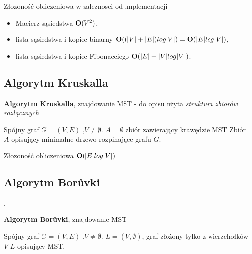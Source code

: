\documentclass[a4paper, 10pt]{article}
\begin{document}
Złozoność obliczeniowa w zaleznosci od implementacji:

\begin{itemize}
\item{Macierz sąsiedstwa ${\bf O}(V^2)$,} 
\item{lista sąsiedstwa i kopiec binarny ${\bf O}((|V| + |E|) log |V|) = {\bf O}(|E| log |V|)$,}
\item{lista sąsiedstwa i kopiec Fibonacciego  	${\bf O}(|E| + |V| log |V|)$.} 
\end{itemize}


	
	\subsection{Algorytm Kruskalla}
	
	
\begin{algorithm}
\caption{{\bf Algorytm Kruskalla}, znajdowanie MST - do opisu użyta \textit{struktura zbiorów rozłącznych}}
\begin{algorithmic}[!h]
\REQUIRE Spójny graf $G=(V,E)$ ,$V \neq \emptyset$. 
\ENSURE $A=\emptyset$ zbiór zawierający krawędzie MST
\ENDFOR 
{}
\ENDIF
\ENDFOR 
\RETURN Zbiór $A$ opisujący minimalne drzewo rozpinające grafu $G$.
\end{algorithmic}
\end{algorithm}
\FloatBarrier

Złozoność obliczeniowa ${\bf O}(|E| log |V|)$

	\subsection{Algorytm Borůvki}.
	
	
\begin{algorithm}
\caption{{\bf Algorytm Borůvki}, znajdowanie MST}
\begin{algorithmic}[!h]
\REQUIRE Spójny graf $G=(V,E)$ ,$V \neq \emptyset$. 
\ENSURE $L=(V,\emptyset)$, graf złożony tylko z wierzchołków $V$
\STATE {}
\STATE {}
\ENDFOR 
\ENDWHILE
\RETURN $L$ opisujący MST.
\end{algorithmic}
\end{algorithm}
\end{document}
